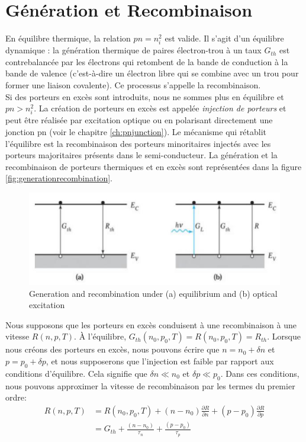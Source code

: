 \section{Génération et Recombinaison}
\label{sec:generationrecombination}
En équilibre thermique, la relation $pn=n_i^2$ est valide. Il s'agit d'un équilibre dynamique : la génération thermique de paires électron-trou à un taux $G_{th}$ est contrebalancée par les électrons qui retombent de la bande de conduction à la bande de valence (c'est-à-dire un électron libre qui se combine avec un trou pour former une liaison covalente). Ce processus s'appelle la recombinaison.\\
Si des porteurs en excès sont introduits, nous ne sommes plus en équilibre et $pn>n_i^2$. La création de porteurs en excès est appelée \emph{injection de porteurs} et peut être réalisée par excitation optique ou en polarisant directement une jonction pn (voir le chapitre \ref{ch:pnjunction}). Le mécanisme qui rétablit l'équilibre est la recombinaison des porteurs minoritaires injectés avec les porteurs majoritaires présents dans le semi-conducteur. La génération et la recombinaison de porteurs thermiques et en excès sont représentées dans la figure \ref{fig:generationrecombination}.
\begin{figure}[h!]
\centering
\includegraphics[width=12cm]{figures/ch01/recombination.jpg}
\caption{Generation and recombination under (a) equilibrium and (b) optical excitation} 
\label{fig:recombination}
\end{figure}
Nous supposons que les porteurs en excès conduisent à une recombinaison à une vitesse $R(n, p, T)$. À l'équilibre, $G_{th}(n_0, p_0, T) = R(n_0, p_0, T) = R_{th}$. Lorsque nous créons des porteurs en excès, nous pouvons écrire que $n = n_0 + \delta n$ et $p = p_0 + \delta p$, et nous supposerons que l'injection est faible par rapport aux conditions d'équilibre. Cela signifie que $\delta n \ll n_0$ et $\delta p \ll p_0$. Dans ces conditions, nous pouvons approximer la vitesse de recombinaison par les termes du premier ordre:
\begin{equation} 
\begin{split}
R(n, p, T) &= R(n_0, p_0, T) + (n-n_0) \frac{\partial R}{\partial n} + (p-p_0) \frac{\partial R}{\partial p} \\
           &= G_{th} +  \frac{(n-n_0)}{\tau_n} + \frac{(p-p_0)}{\tau_p} 
\end{split}
\end{equation} 
